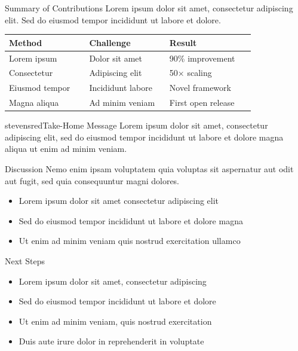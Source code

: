 
\begin{block}{Summary of Contributions}
Lorem ipsum dolor sit amet, consectetur adipiscing elit. Sed do eiusmod tempor incididunt ut labore et dolore.

\vspace{0.4em}
\centering
\small
\setlength{\tabcolsep}{4pt}
\begin{tabular}{@{}p{0.30\linewidth}p{0.30\linewidth}p{0.32\linewidth}@{}}
\toprule
\textbf{Method} & \textbf{Challenge} & \textbf{Result} \\
\midrule
Lorem ipsum   & Dolor sit amet     & 90\% improvement \\
\addlinespace
Consectetur   & Adipiscing elit    & 50$\times$ scaling \\
\addlinespace
Eiusmod tempor & Incididunt labore  & Novel framework \\
\addlinespace
Magna aliqua  & Ad minim veniam    & First open release \\
\bottomrule
\end{tabular}
\end{block}

\begin{colorblock}[white]{stevensred}{Take-Home Message}
Lorem ipsum dolor sit amet, consectetur adipiscing elit, sed do eiusmod tempor incididunt ut labore et dolore magna aliqua ut enim ad minim veniam.
\end{colorblock}

\begin{block}{Discussion}
Nemo enim ipsam voluptatem quia voluptas sit aspernatur aut odit aut fugit, sed quia consequuntur magni dolores.

\vspace{0.4em}
\begin{itemize}
    \item Lorem ipsum dolor sit amet consectetur adipiscing elit
    \item Sed do eiusmod tempor incididunt ut labore et dolore magna
    \item Ut enim ad minim veniam quis nostrud exercitation ullamco
\end{itemize}
\end{block}

\begin{block}{Next Steps}
\begin{itemize}
    \item Lorem ipsum dolor sit amet, consectetur adipiscing
    \item Sed do eiusmod tempor incididunt ut labore et dolore
    \item Ut enim ad minim veniam, quis nostrud exercitation
    \item Duis aute irure dolor in reprehenderit in voluptate
\end{itemize}
\end{block}

